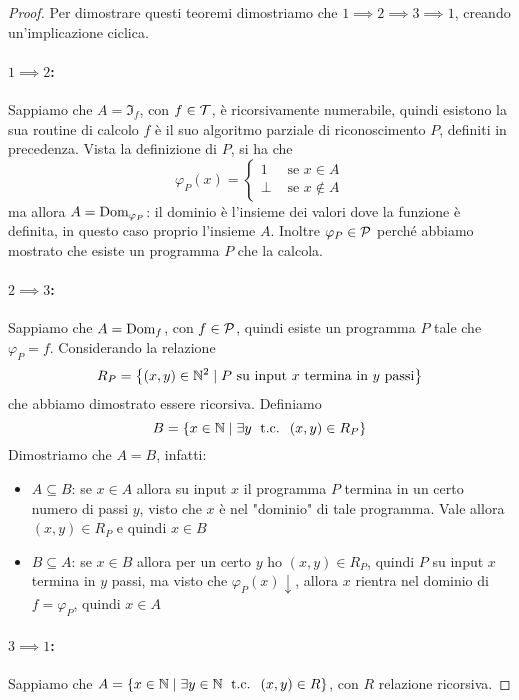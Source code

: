 \begin{proof}
	Per dimostrare questi teoremi dimostriamo che $1 \implies 2 \implies 3 \implies 1$, creando un'implicazione ciclica.

	\paragraph{$1 \implies 2$:} Sappiamo che $A = \Im_f$, con $f \in \mathcal{T}$, è ricorsivamente numerabile, quindi esistono la sua routine di calcolo $f$ è il suo algoritmo parziale di riconoscimento $P$, definiti in precedenza. Vista la definizione di $P$, si ha che
	$$
	\varphi_P (x) = \begin{cases}
		1 & \text{ se } x \in A \\
		\bot & \text{ se } x \notin A
	\end{cases}
	$$
	ma allora $A = \text{Dom}_{\varphi_P}$: il dominio è l'insieme dei valori dove la funzione è definita, in questo caso proprio l'insieme $A$. Inoltre $\varphi_P \in \mathcal{P}$ perché abbiamo mostrato che esiste un programma $P$ che la calcola.

	\paragraph{$2 \implies 3$:} Sappiamo che $A = \text{Dom}_f$, con $f \in \mathcal{P}$, quindi esiste un programma $P$ tale che $\varphi_P = f$. Considerando la relazione
	$$ R_P = \left\{(x,y) \in \mathbb{N}^2 \mid P \text{ su input } x \text{ termina in } y \text{ passi}\right\}$$
	che abbiamo dimostrato essere ricorsiva. Definiamo
	$$ B = \left\{x \in \mathbb{N} \mid \exists y \; \text{ t.c. } \; (x,y) \in R_P \right\} $$
	Dimostriamo che $A = B$, infatti:
	\begin{itemize}
		\item $A \subseteq B$: se $x \in A$ allora su input $x$ il programma $P$ termina in un certo numero di passi $y$, visto che $x$ è nel "dominio" di tale programma. Vale allora $(x,y) \in R_P$ e quindi $x \in B$
        
		\item $B \subseteq A$: se $x \in B$ allora per un certo $y$ ho $(x,y) \in R_P$, quindi $P$ su input $x$ termina in $y$ passi, ma visto che $\varphi_P (x) \downarrow$, allora $x$ rientra nel dominio di $f = \varphi_P$, quindi $x \in A$
	\end{itemize}

	\paragraph{$3 \implies 1$:} Sappiamo che $A = \left\{x \in \mathbb{N} \mid \exists y \in \mathbb{N} \; \text{ t.c. } \; (x,y) \in R \right\}$, con $R$ relazione ricorsiva.


\end{proof}
